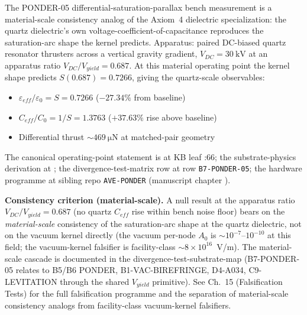 The PONDER-05 differential-saturation-parallax bench measurement is a material-scale consistency analog of the Axiom~4 dielectric specialization: the quartz dielectric's own voltage-coefficient-of-capacitance reproduces the saturation-arc shape the kernel predicts. Apparatus: paired DC-biased quartz resonator thrusters across a vertical gravity gradient, $V_{DC} = \qty{30}{\kilo\volt}$ at an apparatus ratio $V_{DC}/V_{yield} = 0.687$. At this material operating point the kernel shape predicts $S(0.687) = 0.7266$, giving the quartz-scale observables:

\begin{itemize}
    \item $\varepsilon_{eff}/\varepsilon_0 = S = 0.7266$ \quad ($-27.34\%$ from baseline)
    \item $C_{eff}/C_0 = 1/S = 1.3763$ \quad ($+37.63\%$ rise above baseline)
    \item Differential thrust $\sim \qty{469}{\micro\newton}$ at matched-pair geometry
\end{itemize}

The canonical operating-point statement is at KB leaf :66; the substrate-physics derivation at ; the divergence-test-matrix row at  row \texttt{B7-PONDER-05}; the hardware programme at sibling repo \texttt{AVE-PONDER} (manuscript chapter ).

\textbf{Consistency criterion (material-scale).} A null result at the apparatus ratio $V_{DC}/V_{yield} = 0.687$ (no quartz $C_{eff}$ rise within bench noise floor) bears on the \emph{material-scale} consistency of the saturation-arc shape at the quartz dielectric, not on the vacuum kernel directly (the vacuum per-node $A_0$ is $\sim 10^{-7}$--$10^{-10}$ at this field; the vacuum-kernel falsifier is facility-class $\sim 8\times10^{16}$~V/m). The material-scale cascade is documented in the divergence-test-substrate-map (B7-PONDER-05 relates to B5/B6 PONDER, B1-VAC-BIREFRINGE, D4-A034, C9-LEVITATION through the shared $V_{yield}$ primitive). See Ch.~15 (Falsification Tests) for the full falsification programme and the separation of material-scale consistency analogs from facility-class vacuum-kernel falsifiers.


